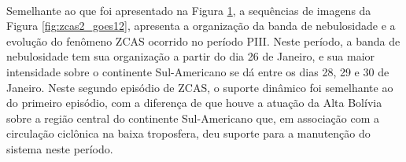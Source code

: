 \begin{figure}[H]
\begin{center}
{        }       
        \\
    \end{center}
    \vspace{2mm}
    \legenda{}
    \label{fig:zcas1_goes12}
\end{figure}

Semelhante ao que foi apresentado na Figura \ref{fig:zcas1_goes12}, a sequências de imagens da Figura \ref{fig:zcas2_goes12}, apresenta a organização da banda de nebulosidade e a evolução do fenômeno ZCAS ocorrido no período PIII. Neste período, a banda de nebulosidade tem sua organização a partir do dia 26 de Janeiro, e sua maior intensidade sobre o continente Sul-Americano se dá entre os dias 28, 29 e 30 de Janeiro. Neste segundo episódio de ZCAS, o suporte dinâmico foi semelhante ao do primeiro episódio, com a diferença de que houve a atuação da Alta Bolívia sobre a região central do continente Sul-Americano que, em associação com a circulação ciclônica na baixa troposfera, deu suporte para a manutenção do sistema neste período.

